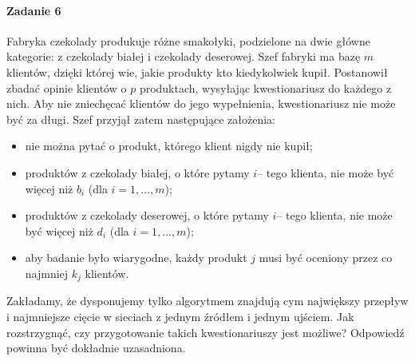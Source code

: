 \paragraph{Zadanie 6} Fabryka czekolady produkuje różne smakołyki, podzielone na dwie główne kategorie: z czekolady białej i czekolady deserowej. Szef fabryki ma bazę $m$ klientów, dzięki której wie, jakie produkty kto kiedykolwiek kupił. Postanowił zbadać opinie klientów o $p$ produktach, wysyłając kwestionariusz do każdego z nich. Aby nie zniechęcać klientów do jego wypełnienia, kwestionariusz nie może być za długi. Szef przyjął zatem następujące założenia:
\begin{itemize}
\item nie można pytać o produkt, którego klient nigdy nie kupił;
\item produktów z czekolady białej, o które pytamy $i$– tego klienta, nie może być więcej niż $b_i$ (dla $i = 1, . . . , m$);
\item produktów z czekolady deserowej, o które pytamy $i$– tego klienta, nie może być więcej niż $d_i$ (dla $i = 1, . . . , m$);
\item aby badanie było wiarygodne, każdy produkt $j$ musi być oceniony przez co najmniej $k_j$ klientów.
\end{itemize}

Zakładamy, że dysponujemy tylko algorytmem znajdują cym największy przepływ i najmniejsze cięcie w sieciach z jednym źródłem i jednym ujściem. Jak rozstrzygnąć, czy przygotowanie takich kwestionariuszy jest możliwe? Odpowiedź powinna być dokładnie uzasadniona.

